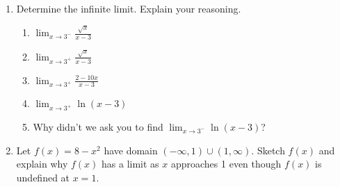 \documentclass[11pt,fleqn]{article}
\begin{document}
\setlength{\parindent}{0cm}
\renewcommand{\headrulewidth}{0pt}
\newcommand{\blank}[1]{\rule{#1}{0.75pt}}
\renewcommand{\d}{\displaystyle}


\vspace*{-1in}
\begin{center}
\end{center}
\begin{enumerate}
\item Determine the infinite limit. Explain your reasoning.
\begin{enumerate}
\item $\displaystyle{\lim_{x \to 3^-}\frac{\sqrt{x}}{x-3}}$\\
\vspace{.5in}
\item $\displaystyle{\lim_{x \to 3^+}\frac{\sqrt{x}}{x-3}}$\\
\vspace{.5in}
\item $\displaystyle{\lim_{x \to 3^+}\frac{{2-10x}}{x-3}}$\\
\vspace{.5in}
\item $\displaystyle{\lim_{x \to 3^+}\ln(x-3)}$\\
\vspace{.5in} 
\item Why didn't we ask you to find $\displaystyle{\lim_{x \to 3^-}\ln(x-3)}$?\\
\vspace{.5in}
\end{enumerate}
\item Let $f(x)=8-x^2$ have domain $(-\infty,1) \cup (1,\infty).$ Sketch $f(x)$ and explain why $f(x)$ has a limit as $x$ approaches 1 even though $f(x)$ is undefined at $x=1.$
\end{enumerate}
\end{document}
